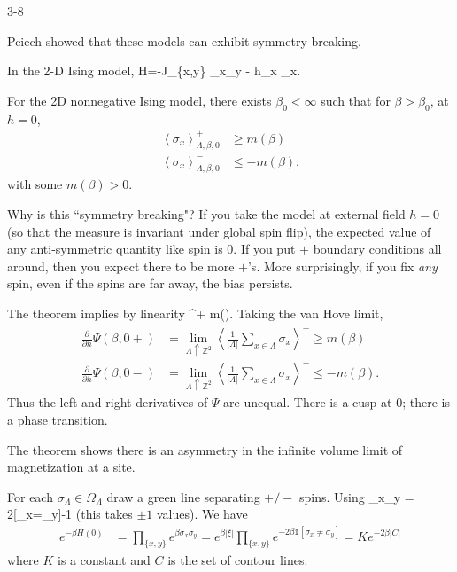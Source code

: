 
{\color{blue}3-8}

Peiech showed that these models can exhibit symmetry breaking.

In the 2-D Ising model, 
\be
H=-J\sum_{\{x,y\}} \sigma_x\sigma_y - h\sum_x \sigma_x.
\ee
\begin{theorem}[Peiech]
For the 2D nonnegative Ising model, there exists $\beta_0<\infty$ such that for $\beta>\beta_0$, at $h=0$,
\begin{align*}
\left\langle {\sigma_x}\right\rangle_{\Lambda,\beta,0}^+ &\ge m(\beta)\\
\left\langle {\sigma_x}\right\rangle_{\Lambda,\beta,0}^- & \le -m(\beta).
\end{align*}
with some $m(\beta)>0$. 
\end{theorem}
Why is this ``symmetry breaking"? If you take the model at external field $h=0$ (so that the measure is invariant under global spin flip), the expected value of any anti-symmetric quantity like spin is 0. If you put $+$ boundary conditions all around, then you expect there to be more $+$'s.  
More surprisingly, if you fix \emph{any} spin, even if the spins are far away, the bias persists.

The theorem implies by linearity
\be
\left{}\right\rangle^+ \ge m(\beta).
\ee
Taking the van Hove limit,
\begin{align*}
\frac{\partial}{\partial h} \Psi(\beta,0+) & = \lim_{\Lambda\Uparrow \mathbb{Z}^2} \left\langle {\frac{1}{|\Lambda|} \sum_{x\in \Lambda} \sigma_x}\right\rangle^+ \ge m(\beta)\\
\frac{\partial}{\partial h} \Psi(\beta,0-)& = \lim_{\Lambda\Uparrow \mathbb{Z}^2} \left\langle {\frac{1}{|\Lambda|} \sum_{x\in \Lambda} \sigma_x}\right\rangle^- \le - m(\beta).
\end{align*}
Thus the left and right derivatives of $\Psi$ are unequal. There is a cusp at 0; there is a phase transition.

The theorem shows there is an asymmetry in the infinite volume limit of magnetization at a site.

For each $\sigma_{\Lambda}\in \Omega_\Lambda$ draw a green line separating $+/-$ spins. 
Using
\be\sigma_x\sigma_y = 2[\sigma_x=\sigma_y]-1\ee
(this takes $\pm1$ values). 
We have
\begin{align*}
e^{-\beta H(0)}&=\prod_{\{x,y\}} e^{\beta \sigma_x\sigma_y} = e^{\beta|\xi|} \prod_{\{x,y\}}  e^{-2\beta \mathds{1}[\sigma_x\ne \sigma_y]} = K e^{-2\beta|C|}
\end{align*}
where $K$ is a constant and $C$ is the set of contour lines.

